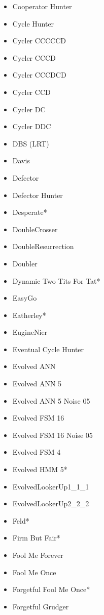 \begin{appendices}
\begin{multicols}{4}
\begin{itemize}
            \item Cooperator Hunter
            \item Cycle Hunter
            \item Cycler CCCCCD
            \item Cycler CCCD
            \item Cycler CCCDCD
            \item Cycler CCD
            \item Cycler DC
            \item Cycler DDC
            \item DBS (LRT)
            \item Davis
            \item Defector
            \item Defector Hunter
            \item Desperate*
            \item DoubleCrosser
            \item DoubleResurrection
            \item Doubler
            \item Dynamic Two Tits For Tat*
            \item EasyGo
            \item Eatherley*
            \item EugineNier
            \item Eventual Cycle Hunter
            \item Evolved ANN
            \item Evolved ANN 5
            \item Evolved ANN 5 Noise 05
            \item Evolved FSM 16
            \item Evolved FSM 16 Noise 05
            \item Evolved FSM 4
            \item Evolved HMM 5*
            \item EvolvedLookerUp1\_1\_1
            \item EvolvedLookerUp2\_2\_2
            \item Feld*
            \item Firm But Fair*
            \item Fool Me Forever
            \item Fool Me Once
            \item Forgetful Fool Me Once*
            \item Forgetful Grudger

\end{itemize}
\end{multicols}
\end{appendices}
